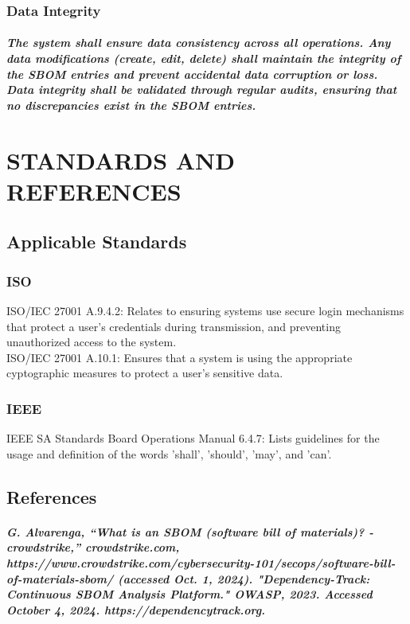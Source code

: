 \documentclass[letterpaper,12pt,oneside,listof=totoc]{scrreprt}
\begin{document}
\subsection{Data Integrity}
\paragraph{ \normalfont
The system shall ensure data consistency across all operations. Any data modifications (create, edit, delete) shall maintain the integrity of the SBOM entries and prevent accidental data corruption or loss. Data integrity shall be validated through regular audits, ensuring that no discrepancies exist in the SBOM entries.
}

\chapter{STANDARDS AND REFERENCES}
 
\section{Applicable Standards}

\subsection{ISO}
ISO/IEC 27001 A.9.4.2: Relates to ensuring systems use secure login mechanisms that protect a user's credentials during transmission, and preventing unauthorized access to the system.\\
ISO/IEC 27001 A.10.1: Ensures that a system is using the appropriate cyptographic measures to protect a user's sensitive data.

\subsection{IEEE}
IEEE SA Standards Board Operations Manual 6.4.7:  Lists guidelines for the usage and definition of the words 'shall', 'should', 'may', and 'can'.


\section{References}
\paragraph{ \normalfont
[1] G. Alvarenga, “What is an SBOM (software bill of materials)? - crowdstrike,” crowdstrike.com, https://www.crowdstrike.com/cybersecurity-101/secops/software-bill-of-materials-sbom/ (accessed Oct. 1, 2024). 
\newline \newline
[2] "Dependency-Track: Continuous SBOM Analysis Platform." OWASP, 2023. Accessed October 4, 2024. https://dependencytrack.org.
}
\end{document}
